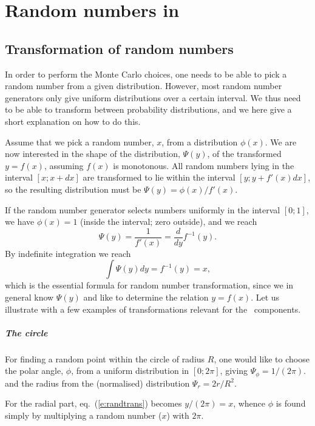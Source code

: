 \chapter{Random numbers in \MCS}
\label{s:random}

\section{Transformation of random numbers}
In order to perform the Monte Carlo choices, one needs to be able to
pick a random number from a given distribution. However, most
random number generators only give
uniform distributions over a certain interval.
We thus need to be able to transform between probability distributions,
and we here give a short explanation on how to do this.

Assume that we pick a random number, $x$, from a distribution $\phi(x)$.
We are now interested in the shape of the distribution, $\Psi(y)$, of the
transformed $y=f(x)$, assuming $f(x)$ is monotonous.
All random numbers lying in the interval $[x; x+dx]$
are transformed to lie within the interval $[y; y+f'(x)dx]$, so the
resulting distribution must be $\Psi(y) = \phi(x) / f'(x)$.

If the random number generator selects numbers uniformly in the interval
$[0; 1]$, we have $\phi(x) = 1$ (inside the interval; zero outside), and
we reach
\begin{equation}
\Psi(y) = \frac{1}{f'(x)} = \frac{d}{dy} f^{-1}(y) .
\end{equation}
By indefinite integration we reach
\begin{equation}
\label{e:randtrans}
\int \Psi(y) dy = f^{-1}(y) = x ,
\end{equation}
which is the essential formula for random number transformation, since we
in general know $\Psi(y)$ and like to determine the relation $y=f(x)$.
Let us illustrate with a few examples of transformations relevant for the
\MCS\ components.

\paragraph{The circle}
For finding a random point within the
circle of radius $R$, one would like to choose the polar angle, $\phi$,
from a uniform
distribution in $[0; 2\pi]$, giving $\Psi_\phi = 1/(2\pi)$.
and the radius from the (normalised) distribution $\Psi_r=2r/R^2$.

For the radial part,
eq.~(\ref{e:randtrans}) becomes $y/(2 \pi) = x$, whence
$\phi$ is found simply by multiplying a random number ($x$)
with $2\pi$.

